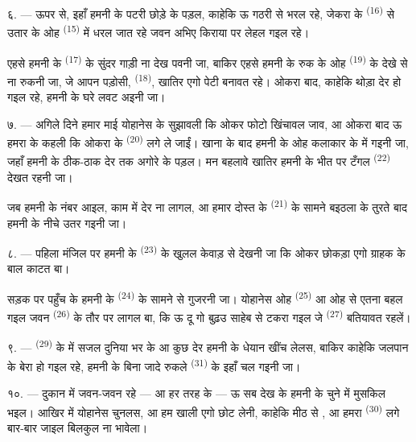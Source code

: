 ६. --- ऊपर से, इहाँ हमनी के पटरी छोड़े के पड़ल, काहेकि ऊ गठरी से भरल
रहे, जेकरा के  \textsuperscript{(16)} से उतार के ओह
 \textsuperscript{(15)} में धरल जात रहे जवन अभिए किराया पर
लेहल गइल रहे।

एहसे हमनी के  \textsuperscript{(17)} के सुंदर
गाड़ी ना देख पवनी जा, बाकिर एहसे हमनी के रुक के ओह  \textsuperscript{(19)} के देखे से ना रुकनी जा, जे आपन पड़ोसी,
 \textsuperscript{(18)}, खातिर एगो पेटी
बनावत रहे। ओकरा बाद, काहेकि थोड़ा देर हो गइल रहे, हमनी के घरे लवट अइनी
जा।

\VUsaut{3.0mm}

७. --- अगिले दिने हमार माई योहानेस के सुझावली कि ओकर फोटो खिंचावल जाव,
आ ओकरा बाद ऊ हमरा के कहली कि ओकरा के 
\textsuperscript{(20)} लगे ले जाईं। खाना के बाद हमनी के ओह कलाकार के
 में गइनी जा, जहाँ हमनी के ठीक-ठाक देर तक अगोरे के
पड़ल। मन बहलावे खातिर हमनी के भीत पर टँगल 
\textsuperscript{(22)} देखत रहनी जा।

जब हमनी के नंबर आइल, काम में देर ना लागल, आ हमार दोस्त के
 \textsuperscript{(21)} के सामने बइठला के तुरते बाद हमनी के
नीचे उतर गइनी जा।

८. --- पहिला मंजिल पर हमनी के  \textsuperscript{(23)} के खुलल
केवाड़ से देखनी जा कि ओकर छोकड़ा एगो ग्राहक के बाल काटत बा।

सड़क पर पहुँच के हमनी के  \textsuperscript{(24)} के
सामने से गुजरनी जा। योहानेस ओह  \textsuperscript{(25)} आ
ओह  से एतना बहल गइल जवन 
\textsuperscript{(26)} के तौर पर लागल बा, कि ऊ दू गो बुढ़उ साहेब से टकरा
गइल जे  \textsuperscript{(27)} बतियावत रहलें।

\VUsaut{3.0mm}

९. ---  \textsuperscript{(29)} के  में सजल
दुनिया भर के  आ  कुछ देर हमनी के धेयान खींच
लेलस, बाकिर काहेकि जलपान के बेरा हो गइल रहे, हमनी के बिना जादे रुकले
 \textsuperscript{(31)} के इहाँ चल गइनी जा।

१०. --- दुकान में जवन-जवन  रहे —  आ हर तरह के  — ऊ सब देख के हमनी के चुने
में मुसकिल भइल। आखिर में योहानेस  चुनलस, आ हम खाली
एगो छोट  लेनी, काहेकि मीठ से , आ हमरा  \textsuperscript{(30)} लगे बार-बार
जाइल बिलकुल ना भावेला।

